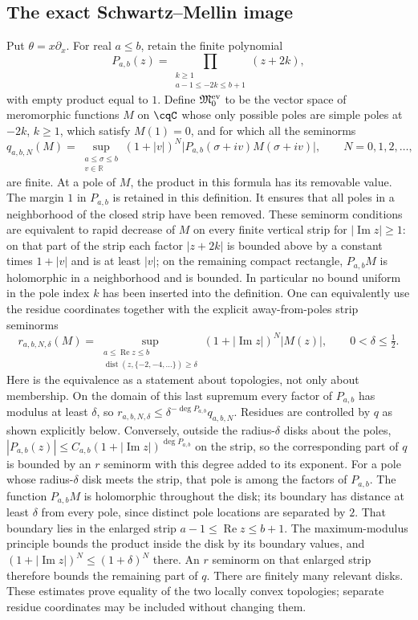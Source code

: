 \subsection{The exact Schwartz--Mellin image}
\label{sec:cq-Schwartz-Mellin-image}
Put $\theta=x\partial_x$. For real $a\leq b$, retain the finite polynomial
\[
 P_{a,b}(z)=\prod_{\substack{k\geq1\\a-1\leq-2k\leq b+1}}(z+2k),
\]
with empty product equal to $1$. Define $\mathfrak M_0^{\rm ev}$
to be the vector space of meromorphic functions $M$ on $\cqC$
whose only possible poles are simple poles at $-2k$, $k\geq1$,
which satisfy $M(1)=0$, and for which all the seminorms
\begin{equation}\label{eq:cq-Mellin-strip-seminorm}
 q_{a,b,N}(M)=
 \sup_{\substack{a\leq\sigma\leq b\\v\in\mathbb R}}
 (1+|v|)^N
 \bigl|P_{a,b}(\sigma+iv)M(\sigma+iv)\bigr|,
 \qquad N=0,1,2,\ldots,
\end{equation}
are finite. At a pole of $M$, the product in this formula has its
removable value. The margin $1$ in $P_{a,b}$ is retained in this
definition. It ensures that all poles in a neighborhood of the
closed strip have been removed. These seminorm conditions are
equivalent to rapid decrease of $M$ on every finite vertical strip
for $|\operatorname{Im}z|\geq1$: on that part of the strip each
factor $|z+2k|$ is bounded above by a constant times $1+|v|$
and is at least $|v|$; on the remaining compact rectangle,
$P_{a,b}M$ is holomorphic in a neighborhood and is bounded.
In particular no bound uniform in the pole index $k$ has been
inserted into the definition.
One can equivalently use the residue coordinates together with
the explicit away-from-poles strip seminorms
\[
 r_{a,b,N,\delta}(M)=
 \sup_{\substack{a\leq\operatorname{Re}z\leq b\\
       \operatorname{dist}(z,\{-2,-4,\ldots\})\geq\delta}}
   (1+|\operatorname{Im}z|)^N|M(z)|,
 \qquad 0<\delta\leq\tfrac12.
\]
Here is the equivalence as a statement about topologies, not only
about membership. On the domain of this last supremum every
factor of $P_{a,b}$ has modulus at least $\delta$, so
$r_{a,b,N,\delta}\leq\delta^{-\deg P_{a,b}}q_{a,b,N}$.
Residues are controlled by $q$ as shown explicitly below.
Conversely, outside the radius-$\delta$ disks about the poles,
$|P_{a,b}(z)|\leq C_{a,b}(1+|\operatorname{Im}z|)^{\deg P_{a,b}}$
on the strip, so the corresponding part of $q$ is bounded by
an $r$ seminorm with this degree added to its exponent.
For a pole whose radius-$\delta$ disk meets the strip, that pole
is among the factors of $P_{a,b}$. The function $P_{a,b}M$
is holomorphic throughout the disk; its boundary has distance
at least $\delta$ from every pole, since distinct pole locations
are separated by $2$. That boundary lies in the enlarged strip
$a-1\leq\operatorname{Re}z\leq b+1$. The maximum-modulus
principle bounds the product inside the disk by its boundary
values, and $(1+|\operatorname{Im}z|)^N\leq(1+\delta)^N$
there. An $r$ seminorm on that enlarged strip therefore bounds
the remaining part of $q$. There are finitely many relevant disks.
These estimates prove equality of the two locally convex
topologies; separate residue coordinates may be included without
changing them.

